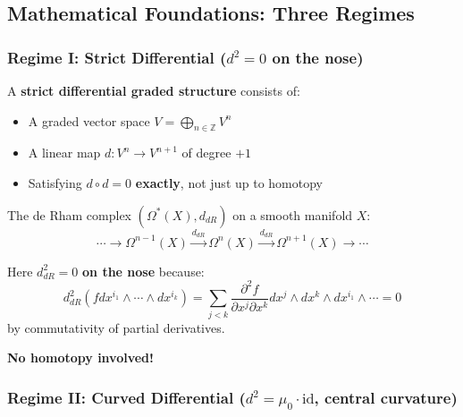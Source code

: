 \subsection{Mathematical Foundations: Three Regimes}

\subsubsection{Regime I: Strict Differential ($d^2 = 0$ on the nose)}

\begin{definition}\label{def:strict-dg}
A \textbf{strict differential graded structure} consists of:
\begin{itemize}
\item A graded vector space $V = \bigoplus_{n \in \mathbb{Z}} V^n$
\item A linear map $d: V^n \to V^{n+1}$ of degree $+1$
\item Satisfying $d \circ d = 0$ \textbf{exactly}, not just up to homotopy
\end{itemize}
\end{definition}

\begin{example}
The de Rham complex $(\Omega^*(X), d_{dR})$ on a smooth manifold $X$:
$$\cdots \to \Omega^{n-1}(X) \xrightarrow{d_{dR}} \Omega^n(X) \xrightarrow{d_{dR}} 
\Omega^{n+1}(X) \to \cdots$$

Here $d_{dR}^2 = 0$ \textbf{on the nose} because:
$$d_{dR}^2(f dx^{i_1} \wedge \cdots \wedge dx^{i_k}) 
= \sum_{j < k} \frac{\partial^2 f}{\partial x^j \partial x^k} dx^j \wedge dx^k \wedge dx^{i_1} 
\wedge \cdots = 0$$
by commutativity of partial derivatives.

\textbf{No homotopy involved!}
\end{example}

\subsubsection{Regime II: Curved Differential ($d^2 = \mu_0 \cdot \text{id}$, central curvature)}

